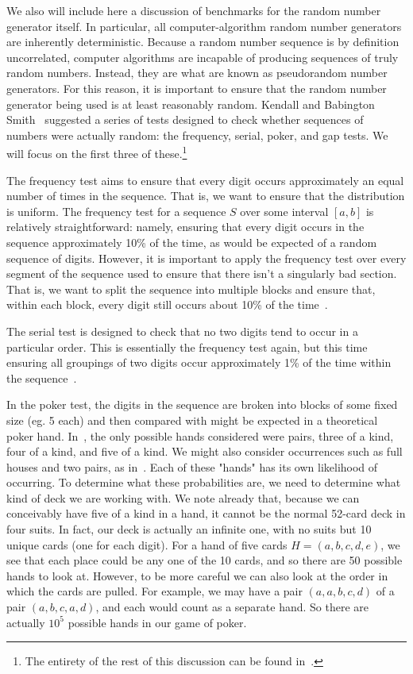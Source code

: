 \documentclass[12pt]{article}
\numberwithin{equation}{section}
\begin{document}
\par We also will include here a discussion of benchmarks for the random number generator itself.  In particular, all computer-algorithm random number generators are inherently deterministic.  Because a random number sequence is by definition uncorrelated, computer algorithms are incapable of producing sequences of truly random numbers. Instead, they are what are known as pseudorandom number generators.  For this reason, it is important to ensure that the random number generator being used is at least reasonably random.  Kendall and Babington Smith~\cite{babington} suggested a series of tests designed to check whether sequences of numbers were actually random: the frequency, serial, poker, and gap tests.  We will focus on the first three of these.\footnote{The entirety of the rest of this discussion can be found in~\cite{drueke}.}  
\par The frequency test aims to ensure that every digit occurs approximately an equal number of times in the sequence.  That is, we want to ensure that the distribution is uniform.  The frequency test for a sequence $S$ over some interval $[a,b]$ is relatively straightforward: namely, ensuring that every digit occurs in the sequence approximately 10\% of the time, as would be expected of a random sequence of digits.  However, it is important to apply the frequency test over every segment of the sequence used to ensure that there isn't a singularly bad section.  That is, we want to split the sequence into multiple blocks and ensure that, within each block, every digit still occurs about 10\% of the time~\cite{odell,gruenberger,drueke}.
\par The serial test is designed to check that no two digits tend to occur in a particular order. This is essentially the frequency test again, but this time ensuring all groupings of two digits occur approximately 1\% of the time within the sequence~\cite{odell,gruenberger,drueke}.
\par In the poker test, the digits in the sequence are broken into blocks of some fixed size (eg. 5 each) and then compared with might be expected in a theoretical poker hand.  In~\cite{odell}, the only possible hands considered were pairs, three of a kind, four of a kind, and five of a kind.  We might also consider occurrences such as full houses and two pairs, as in~\cite{babington}.  Each of these "hands" has its own likelihood of occurring.  To determine what these probabilities are, we need to determine what kind of deck we are working with.  We note already that, because we can conceivably have five of a kind in a hand, it cannot be the normal 52-card deck in four suits.  In fact, our deck is actually an infinite one, with no suits but 10 unique cards (one for each digit).  For a hand of five cards $H=(a,b,c,d,e)$, we see that each place could be any one of the 10 cards, and so there are 50 possible hands to look at.  However, to be more careful we can also look at the order in which the cards are pulled.  For example, we may have a pair $(a,a,b,c,d)$ of a pair $(a,b,c,a,d)$, and each would count as a separate hand.  So there are actually $10^{5}$ possible hands in our game of poker.  
\end{document}
